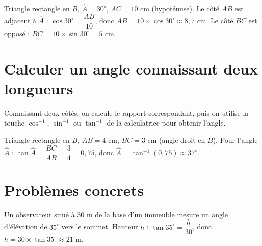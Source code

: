 \begin{exemple}
Triangle rectangle en $B$, $\widehat A=30^{\circ}$, $AC=10$ cm (hypoténuse). Le côté $AB$
est adjacent à $\widehat A$ : $\cos30^{\circ}=\dfrac{AB}{10}$, donc
$AB=10\times\cos30^{\circ}\approx8{,}7$ cm. Le côté $BC$ est opposé :
$BC=10\times\sin30^{\circ}=5$ cm.
\end{exemple}

\section{Calculer un angle connaissant deux longueurs}

\begin{propriete}
Connaissant deux côtés, on calcule le rapport correspondant, puis on utilise la touche
$\cos^{-1}$, $\sin^{-1}$ ou $\tan^{-1}$ de la calculatrice pour obtenir l'angle.
\end{propriete}

\begin{exemple}
Triangle rectangle en $B$, $AB=4$ cm, $BC=3$ cm (angle droit en $B$). Pour l'angle
$\widehat A$ : $\tan\widehat A=\dfrac{BC}{AB}=\dfrac34=0{,}75$, donc
$\widehat A=\tan^{-1}(0{,}75)\approx37^{\circ}$.
\end{exemple}

\section{Problèmes concrets}

\begin{illus}
\end{illus}

\begin{exemple}
Un observateur situé à $30$ m de la base d'un immeuble mesure un angle d'élévation de
$35^{\circ}$ vers le sommet. Hauteur $h$ : $\tan35^{\circ}=\dfrac h{30}$, donc
$h=30\times\tan35^{\circ}\approx21$ m.
\end{exemple}

